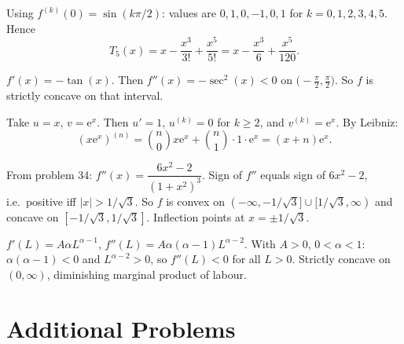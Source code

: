 \begin{solutions}
  \item Using $f^{(k)}(0)=\sin(k\pi/2)$: values are $0,1,0,-1,0,1$ for
        $k=0,1,2,3,4,5$. Hence
        \[
          T_{5}(x)=x-\frac{x^{3}}{3!}+\frac{x^{5}}{5!}
                  =x-\frac{x^{3}}{6}+\frac{x^{5}}{120} .
        \]

  \item $f'(x)=-\tan(x)$. Then $f''(x)=-\sec^{2}(x)<0$ on
        $\bigl(-\tfrac{\pi}{2},\tfrac{\pi}{2}\bigr)$. So $f$ is strictly
        concave on that interval.

  \item Take $u=x$, $v=\mathrm{e}^{x}$. Then $u'=1$, $u^{(k)}=0$ for
        $k\geq 2$, and $v^{(k)}=\mathrm{e}^{x}$. By Leibniz:
        \[
          (x\mathrm{e}^{x})^{(n)}
            =\binom{n}{0}x\mathrm{e}^{x}+\binom{n}{1}\cdot 1\cdot\mathrm{e}^{x}
            =(x+n)\mathrm{e}^{x} .
        \]

  \item From problem 34: $f''(x)=\dfrac{6x^{2}-2}{(1+x^{2})^{3}}$. Sign of
        $f''$ equals sign of $6x^{2}-2$, i.e.\ positive iff
        $|x|>1/\sqrt{3}$. So $f$ is convex on
        $(-\infty,-1/\sqrt{3}]\cup[1/\sqrt{3},\infty)$ and concave on
        $[-1/\sqrt{3},1/\sqrt{3}]$. Inflection points at $x=\pm 1/\sqrt{3}$.

  \item $f'(L)=A\alpha L^{\alpha-1}$, $f''(L)=A\alpha(\alpha-1)L^{\alpha-2}$.
        With $A>0$, $0<\alpha<1$: $\alpha(\alpha-1)<0$ and
        $L^{\alpha-2}>0$, so $f''(L)<0$ for all $L>0$. Strictly concave on
        $(0,\infty)$, diminishing marginal product of labour.
\end{solutions}

\section{Additional Problems}

